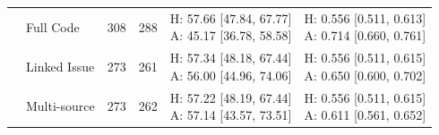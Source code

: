 \begin{table}[tbp]
\begin{tabular}{llrrll}
 & Full Code & 308 & 288 & \shortstack[l]{H: 57.66 [47.84, 67.77]\\A: 45.17 [36.78, 58.58]} & \shortstack[l]{H: 0.556 [0.511, 0.613]\\A: 0.714 [0.660, 0.761]} \\
 & Linked Issue & 273 & 261 & \shortstack[l]{H: 57.34 [48.18, 67.44]\\A: 56.00 [44.96, 74.06]} & \shortstack[l]{H: 0.556 [0.511, 0.615]\\A: 0.650 [0.600, 0.702]} \\
 & Multi-source & 273 & 262 & \shortstack[l]{H: 57.22 [48.19, 67.44]\\A: 57.14 [43.57, 73.51]} & \shortstack[l]{H: 0.556 [0.511, 0.615]\\A: 0.611 [0.561, 0.652]} \\
\bottomrule
\end{tabular}
\end{table}
